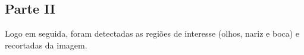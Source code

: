 \documentclass[journal]{IEEEtran}
\begin{document}
\begin{figure}[h]
\centering
{}
\end{figure}

\newline

\subsection*{Parte II}
Logo em seguida, foram detectadas as regiões de interesse (olhos, nariz e boca) e recortadas da imagem.\\
\end{document}
